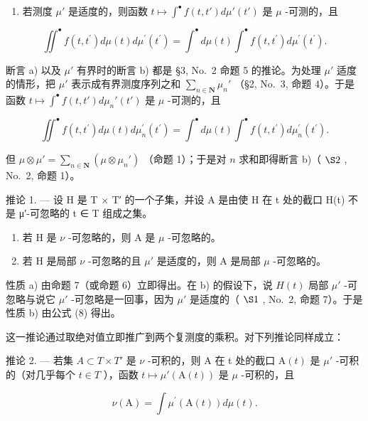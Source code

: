\begin{enumerate}
\def\labelenumi{\alph{enumi})}
\setcounter{enumi}{1}
\tightlist
\item
  若测度 \(\mu'\) 是适度的，则函数 \(t \mapsto \int^{\bullet} f(t, t') d\mu'(t')\) 是 \(\mu\) -可测的，且
\end{enumerate}

\[
\iint^ {\bullet} f (t, t ^ {\prime}) d \mu (t) d \mu^ {\prime} (t ^ {\prime}) = \int^ {\bullet} d \mu (t) \int^ {\bullet} f (t, t ^ {\prime}) d \mu^ {\prime} (t ^ {\prime}).\tag{8}
\]

断言 a) 以及 \(\mu'\) 有界时的断言 b) 都是 §3, No.~2 命题 5 的推论。为处理 \(\mu'\) 适度的情形，把 \(\mu'\) 表示成有界测度序列之和 \(\sum_{n\in\mathbf{N}}\mu_n'\) （§2, No.~3, 命题 4）。于是函数 \(t\mapsto\int^{\bullet}f(t,t')d\mu_n'(t')\) 是 \(\mu\) -可测的，且

\[
\iint^ {\bullet} f (t, t ^ {\prime}) d \mu (t) d \mu_ {n} ^ {\prime} (t ^ {\prime}) = \int^ {\bullet} d \mu (t) \int^ {\bullet} f (t, t ^ {\prime}) d \mu_ {n} ^ {\prime} (t ^ {\prime}).
\]

但 \(\mu \otimes \mu' = \sum_{n \in \mathbf{N}} (\mu \otimes \mu_n')\) （命题 1）；于是对 \(n\) 求和即得断言 b)（ \(\S 2\) , No.~2, 命题 1）。

推论 1. --- 设 H 是 T × T′ 的一个子集，并设 A 是由使 H 在 t 处的截口 H(t) 不是 μ′-可忽略的 t ∈ T 组成之集。

\begin{enumerate}
\def\labelenumi{\alph{enumi})}
\item
  若 H 是 \(\nu\) -可忽略的，则 A 是 \(\mu\) -可忽略的。
\item
  若 H 是局部 \(\nu\) -可忽略的且 \(\mu'\) 是适度的，则 A 是局部 \(\mu\) -可忽略的。
\end{enumerate}

性质 a) 由命题 7（或命题 6）立即得出。在 b) 的假设下，说 \(H(t)\) 局部 \(\mu'\) -可忽略与说它 \(\mu'\) -可忽略是一回事，因为 \(\mu'\) 是适度的（ \(\S1\) , No.~2, 命题 7）。于是性质 b) 由公式 (8) 得出。

这一推论通过取绝对值立即推广到两个复测度的乘积。对下列推论同样成立：

推论 2. --- 若集 \(A \subset T \times T'\) 是 \(\nu\) -可积的，则 A 在 t 处的截口 \(\mathrm{A}(t)\) 是 \(\mu'\) -可积的（对几乎每个 \(t \in T\) ），函数 \(t \mapsto \mu'(\mathrm{A}(t))\) 是 \(\mu\) -可积的，且

\[
\nu (\mathrm{A}) = \int \mu^ {\prime} (\mathrm{A} (t)) d \mu (t).\tag{9}
\]

